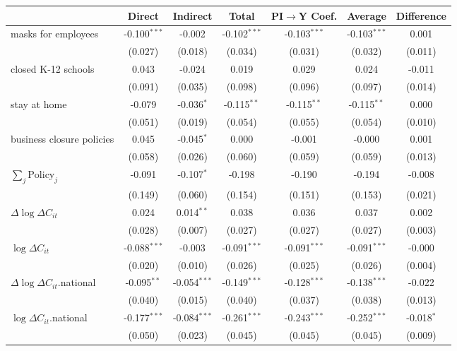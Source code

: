 
\begin{tabular}{lccccc|>{}c}
\toprule
  & Direct & Indirect & Total & PI$\to$Y Coef. & Average & Difference\\
\midrule
masks for employees & -0.100$^{***}$ & -0.002 & -0.102$^{***}$ & -0.103$^{***}$ & -0.103$^{***}$ & 0.001\\
 & (0.027) & (0.018) & (0.034) & (0.031) & (0.032) & (0.011)\\
closed K-12 schools & 0.043 & -0.024 & 0.019 & 0.029 & 0.024 & -0.011\\
 & (0.091) & (0.035) & (0.098) & (0.096) & (0.097) & (0.014)\\
stay at home & -0.079 & -0.036$^{*}$ & -0.115$^{**}$ & -0.115$^{**}$ & -0.115$^{**}$ & 0.000\\
 & (0.051) & (0.019) & (0.054) & (0.055) & (0.054) & (0.010)\\
business closure policies & 0.045 & -0.045$^{*}$ & 0.000 & -0.001 & -0.000 & 0.001\\
 & (0.058) & (0.026) & (0.060) & (0.059) & (0.059) & (0.013)\\
$\sum_j \mathrm{Policy}_j$ & -0.091 & -0.107$^{*}$ & -0.198 & -0.190 & -0.194 & -0.008\\
 & (0.149) & (0.060) & (0.154) & (0.151) & (0.153) & (0.021)\\
$\Delta \log \Delta C_{it}$ & 0.024 & 0.014$^{**}$ & 0.038 & 0.036 & 0.037 & 0.002\\
 & (0.028) & (0.007) & (0.027) & (0.027) & (0.027) & (0.003)\\
$\log \Delta C_{it}$ & -0.088$^{***}$ & -0.003 & -0.091$^{***}$ & -0.091$^{***}$ & -0.091$^{***}$ & -0.000\\
 & (0.020) & (0.010) & (0.026) & (0.025) & (0.026) & (0.004)\\
$\Delta \log \Delta C_{it}$.national & -0.095$^{**}$ & -0.054$^{***}$ & -0.149$^{***}$ & -0.128$^{***}$ & -0.138$^{***}$ & -0.022\\
 & (0.040) & (0.015) & (0.040) & (0.037) & (0.038) & (0.013)\\
$\log \Delta C_{it}$.national & -0.177$^{***}$ & -0.084$^{***}$ & -0.261$^{***}$ & -0.243$^{***}$ & -0.252$^{***}$ & -0.018$^{*}$\\
 & (0.050) & (0.023) & (0.045) & (0.045) & (0.045) & (0.009)\\
\bottomrule
\end{tabular}